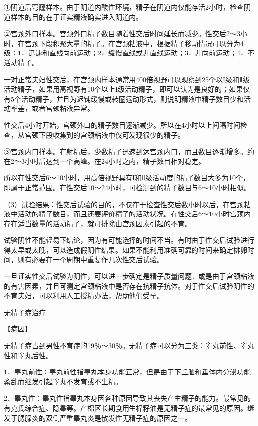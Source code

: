 \documentclass[12pt,UTF8]{ctexbook}
\begin{document}
①阴道后穹窿样本。由于阴道内酸性环境，精子在阴道内仅能存活2小时，检查阴道样本的目的在于证实精液确实进入阴道内。

②宫颈外口样本。宫颈外口精子数目随着性交后时间延长而减少。性交后2～3小时，在宫颈下段积聚大量的精子。在宫颈粘液中，根据精子移动情况可以分为4级：1．迅速和直线向前运动；2．缓慢直线或非直线运动；3．非向前运动；4．不活动精子。

一对正常夫妇性交后，在宫颈内样本通常用400倍视野可以观察到25个以I级和Ⅱ级活动精子，如果用高视野有10个以上I级活动精子，即可以认为是良好的；如果仅有5个活动精子，并且为迟钝缓慢或转圈运动形式，则说明精液中精子数目少和活动率差，或者宫颈粘液异常。

性交后4小时开始，宫颈外口的精子数目逐渐减少。所以在4小时以上间隔时间检查，从宫颈下段收集到的宫颈粘液中仅可发现很少的精子。

③宫颈内口样本。在射精后，少数精子迅速到达宫颈内口，而且数目逐渐增多。约在2～3小时后达到一个高峰。在24小时之内，精子数目相对稳定。

所以在性交后6～10小时，用高倍视野具有I和Ⅱ级活动度的精子数目大多为10个，即属于正常范围。在性交后10～24小时，可检测到的精子数目与6～10小时相似。

（3）试验结果：性交后试验的目的，不仅在于检查性交后数小时以后，在宫颈粘液中活动的精子数目，而且还要评价精子的活动状况。在性交后6～10小时宫颈内存在适当数量的活动精子，就可排除由宫颈因素引起的不育。

试验阴性不能轻易下结论，因为有可能选择的时间不当。有时由于性交后试验进行得太早或太晚，可以造成假阴性结果。如果不能利用准确可靠的时间来确定排卵时间，则有必要在一个周期中重复作几次性交后试验。

一旦证实性交后试验为阴性，可以进一步确定是精子质量问题，或是由于宫颈粘液的有害因素，并且可测定宫颈粘液中是否存在抗精子抗体。对于性交后试验阴性的不育夫妇，可以利用人工授精办法，帮助他们受孕。





无精子症治疗


【病因】

无精子症占到男性不育症的19％～30％。无精子症可以分为三类：睾丸前性、睾丸性和睾丸后性。

1．睾丸前性：睾丸前性指睾丸本身功能正常，但是由于下丘脑和垂体内分泌功能紊乱而继发引起睾丸不发育或不生精。

2．睾丸性：睾丸性指睾丸本身因各种原因导致其丧失产生精子的能力。最常见的有克氏综合症、隐睾等。产棉区长期食用生棉籽油是无精子症的最常见的原因。继发于腮腺炎的双侧严重睾丸炎是散发性无精子症的原因之一。
\end{document}

